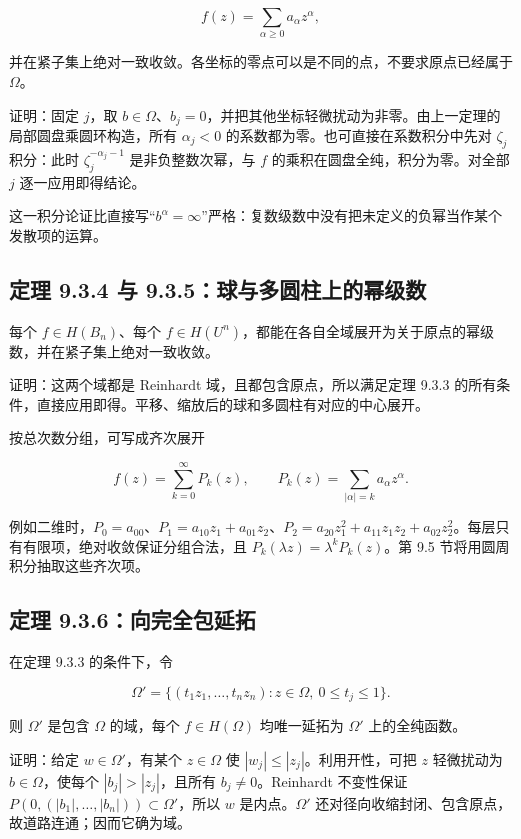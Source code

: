 \documentclass[11pt,a4paper]{article}
\begin{document}
\[
f(z)=\sum_{\alpha\ge0}a_\alpha z^\alpha,
\]

并在紧子集上绝对一致收敛。各坐标的零点可以是不同的点，不要求原点已经属于
\(\Omega\)。

证明：固定 \(j\)，取
\(b\in\Omega\)、\(b_j=0\)，并把其他坐标轻微扰动为非零。由上一定理的局部圆盘乘圆环构造，所有
\(\alpha_j<0\) 的系数都为零。也可直接在系数积分中先对 \(\zeta_j\)
积分：此时 \(\zeta_j^{-\alpha_j-1}\) 是非负整数次幂，与 \(f\)
的乘积在圆盘全纯，积分为零。对全部 \(j\) 逐一应用即得结论。

这一积分论证比直接写``\(b^\alpha=\infty\)''严格：复数级数中没有把未定义的负幂当作某个发散项的运算。

\subsection{定理 9.3.4 与 9.3.5：球与多圆柱上的幂级数}\label{ch09-s3-heading-5}

每个 \(f\in H(B_n)\)、每个
\(f\in H(U^n)\)，都能在各自全域展开为关于原点的幂级数，并在紧子集上绝对一致收敛。

证明：这两个域都是 Reinhardt 域，且都包含原点，所以满足定理 9.3.3
的所有条件，直接应用即得。平移、缩放后的球和多圆柱有对应的中心展开。

按总次数分组，可写成齐次展开

\[
f(z)=\sum_{k=0}^\infty P_k(z),\qquad
P_k(z)=\sum_{|\alpha|=k}a_\alpha z^\alpha.
\]

例如二维时，\(P_0=a_{00}\)、\(P_1=a_{10}z_1+a_{01}z_2\)、\(P_2=a_{20}z_1^2+a_{11}z_1z_2+a_{02}z_2^2\)。每层只有有限项，绝对收敛保证分组合法，且
\(P_k(\lambda z)=\lambda^kP_k(z)\)。第 9.5
节将用圆周积分抽取这些齐次项。

\subsection{定理 9.3.6：向完全包延拓}\label{ch09-s3-heading-6}

在定理 9.3.3 的条件下，令

\[
\Omega'=\{(t_1z_1,\ldots,t_nz_n):z\in\Omega,\ 0\le t_j\le1\}.
\]

则 \(\Omega'\) 是包含 \(\Omega\) 的域，每个 \(f\in H(\Omega)\)
均唯一延拓为 \(\Omega'\) 上的全纯函数。

证明：给定 \(w\in\Omega'\)，有某个 \(z\in\Omega\) 使
\(|w_j|\le|z_j|\)。利用开性，可把 \(z\) 轻微扰动为
\(b\in\Omega\)，使每个 \(|b_j|>|z_j|\)，且所有 \(b_j\ne0\)。Reinhardt
不变性保证 \(P(0,(|b_1|,\ldots,|b_n|))\subset\Omega'\)，所以 \(w\)
是内点。\(\Omega'\)
还对径向收缩封闭、包含原点，故道路连通；因而它确为域。
\end{document}
